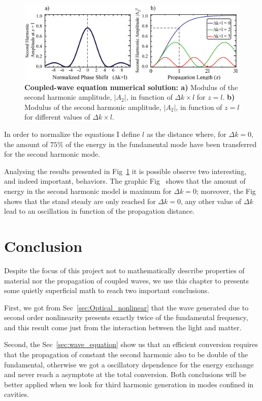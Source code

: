 \begin{figure}[h!]
    \centering
    \includegraphics[width = 16cm]{figuras/Dissertation_coppled_eq_sol.jpg}
    \caption{\textbf{Coupled-wave equation numerical solution: a)} Modulus of the second harmonic amplitude, $|A_2|$, in function of $\Delta k \times l$ for $z = l$. \textbf{b)} Modulus of the second harmonic amplitude, $|A_2|$, in function of $z = l$ for different values of $\Delta k \times l$.}
    \label{fig:model_solution}
\end{figure}

In order to normalize the equations I define $l$ as the distance where, for $\Delta k = 0$, the amount of $75\%$ of the energy in the fundamental mode have been transferred for the second harmonic mode. 

Analysing the results presented in Fig~\ref{fig:model_solution} it is possible observe two interesting, and indeed important, behaviors. The graphic Fig~ shows that the amount of energy in the second harmonic model is maximum for $\Delta k = 0$; moreover, the Fig~ shows that the stand steady are only reached for $\Delta k = 0$, any other value of $\Delta k$ lead to an oscillation in function of the propagation distance.

\section{Conclusion}
Despite the focus of this project not to mathematically describe properties of material nor the propagation of coupled waves, we use this chapter to presents some quietly superficial math to reach two important conclusions.

First, we got from Sec~\ref{sec:Optical_nonlinear} that the wave generated due to second order nonlinearity presents exactly twice of the fundamental frequency, and this result come just from the interaction between the light and matter. 

Second, the Sec~\ref{sec:wave_equation} show us that an efficient conversion requires that the propagation of constant the second harmonic also to be double of the fundamental, otherwise we got a oscillatory dependence for the energy exchange and never reach a asymptote at the total conversion. 
% 
%
%
Both conclusions will be better applied when we look for third harmonic generation in  modes confined in cavities. 

